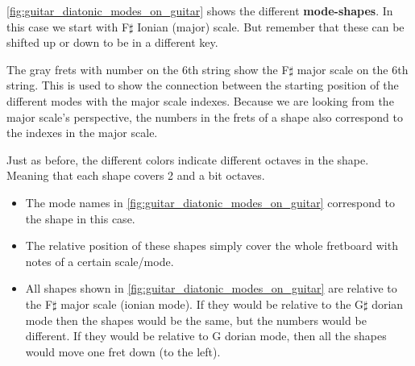 \autoref{fig:guitar_diatonic_modes_on_guitar} shows the different \textbf{mode-shapes}. In this case we start with F$\sharp$ Ionian (major) scale. But remember that these can be shifted up or down to be in a different key.

The gray frets with number on the 6th string show the F$\sharp$ major scale on the 6th string. This is used to show the connection between the starting position of the different modes with the major scale indexes. Because we are looking from the major scale's perspective, the numbers in the frets of a shape also correspond to the indexes in the major scale.

Just as before, the different colors indicate different octaves in the shape. Meaning that each shape covers 2 and a bit octaves.

\infobox
{
	\begin{itemize}
		\item The mode names in \autoref{fig:guitar_diatonic_modes_on_guitar} correspond to the shape in this case.
		\item The relative position of these shapes simply cover the whole fretboard with notes of a certain scale/mode.
		\item All shapes shown in \autoref{fig:guitar_diatonic_modes_on_guitar} are relative to the F$\sharp$ major scale (ionian mode). If they would be relative to the G$\sharp$ dorian mode then the shapes would be the same, but the numbers would be different. If they would be relative to G dorian mode, then all the shapes would move one fret down (to the left). 
	\end{itemize}
}

\newpage

